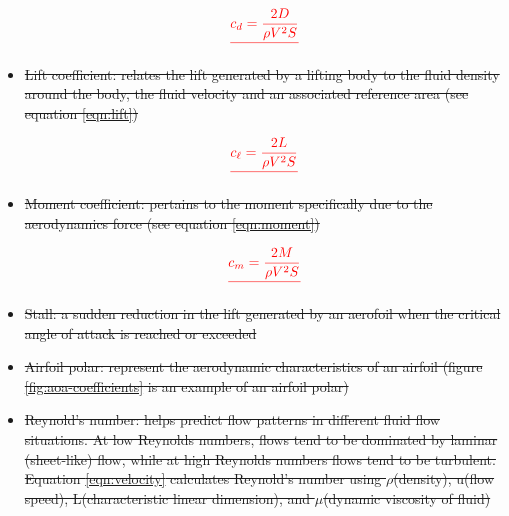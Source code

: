 \documentclass{journal}
\providecommand{\DIFdel}[1]{{\protect\color{red}\sout{#1}}}                      %
\begin{document}
\begin{itemize}
\begin{displaymath}
			\DIFdel{\centering
			c_d = \frac{2D}{\rho{V^2}S}
		}\end{displaymath}%

\item%
\DIFdel{Lift coefficient: relates the lift generated by a lifting body to the fluid density around the body, the fluid velocity and an associated reference area (see equation \ref{eqn:lift})
		}%

\begin{displaymath}
			\DIFdel{\centering
			c_\ell = \frac{2L}{\rho{V^2}S}
		}\end{displaymath}%

\item%
\DIFdel{Moment coefficient: pertains to the moment specifically due to the aerodynamics force (see equation \ref{eqn:moment})
		}%

\begin{displaymath}
			\DIFdel{\centering
			c_m = \frac{2M}{\rho{V^2}S}
		}\end{displaymath}%

\item%
\DIFdel{Stall: a sudden reduction in the lift generated by an aerofoil when the critical angle of attack is reached or exceeded	
		}%
\item%
\DIFdel{Airfoil polar: represent the aerodynamic characteristics of an airfoil (figure \ref{fig:aoa-coefficients} is an example of an airfoil polar)
		}%
\item%
\DIFdel{Reynold's number: helps predict flow patterns in different fluid flow situations. At low Reynolds numbers, flows tend to be dominated by laminar (sheet-like) flow, while at high Reynolds numbers flows tend to be turbulent. Equation \ref{eqn:velocity} calculates Reynold's number using \(\rho\)(density), u(flow speed), L(characteristic linear dimension), and \(\mu\)(dynamic viscosity of fluid)
		}%


\end{itemize}
\end{document}
